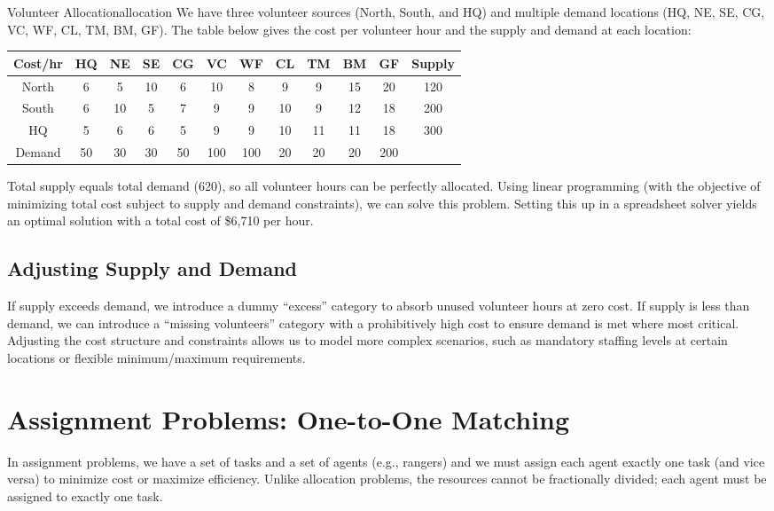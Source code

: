\begin{example}{Volunteer Allocation}{allocation}
We have three volunteer sources (North, South, and HQ) and multiple demand locations (HQ, NE, SE, CG, VC, WF, CL, TM, BM, GF). The table below gives the cost per volunteer hour and the supply and demand at each location:

\begin{center}
\begin{tabular}{|c|c|c|c|c|c|c|c|c|c|c|c|}
\hline
Cost/hr & HQ & NE & SE & CG & VC & WF & CL & TM & BM & GF & Supply \\
\hline
North & 6 & 5 & 10 & 6 & 10 & 8 & 9 & 9 & 15 & 20 & 120 \\
\hline
South & 6 & 10 & 5 & 7 & 9 & 9 & 10 & 9 & 12 & 18 & 200 \\
\hline
HQ & 5 & 6 & 6 & 5 & 9 & 9 & 10 & 11 & 11 & 18 & 300 \\
\hline
Demand & 50 & 30 & 30 & 50 &100 &100 & 20 & 20 & 20 & 200 &  \\
\hline
\end{tabular}
\end{center}

Total supply equals total demand (620), so all volunteer hours can be perfectly allocated. Using linear programming (with the objective of minimizing total cost subject to supply and demand constraints), we can solve this problem. Setting this up in a spreadsheet solver yields an optimal solution with a total cost of \$6,710 per hour.
\end{example}

\subsection*{Adjusting Supply and Demand}
If supply exceeds demand, we introduce a dummy “excess” category to absorb unused volunteer hours at zero cost. If supply is less than demand, we can introduce a “missing volunteers” category with a prohibitively high cost to ensure demand is met where most critical. Adjusting the cost structure and constraints allows us to model more complex scenarios, such as mandatory staffing levels at certain locations or flexible minimum/maximum requirements.

\section{Assignment Problems: One-to-One Matching}
In assignment problems, we have a set of tasks and a set of agents (e.g., rangers) and we must assign each agent exactly one task (and vice versa) to minimize cost or maximize efficiency. Unlike allocation problems, the resources cannot be fractionally divided; each agent must be assigned to exactly one task.

